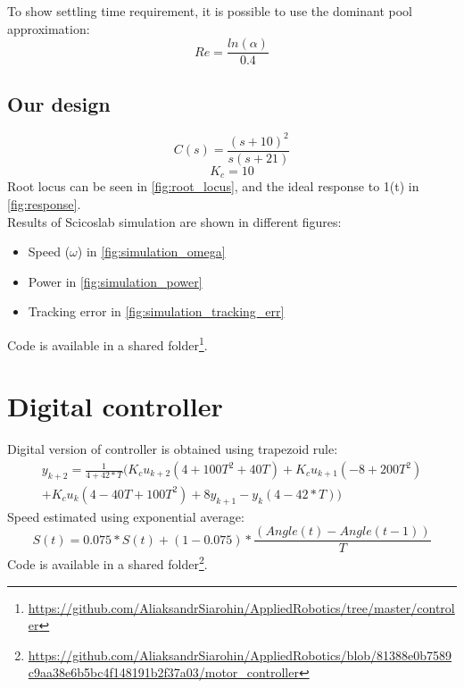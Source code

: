 \documentclass[a4paper,12pt,oneside]{article}
\begin{document}
To show settling time requirement, it is possible to use the dominant pool approximation:
\begin{equation}
Re = \frac{ln(\alpha)}{0.4}
\end{equation}

\subsection{Our design}
\begin{equation}
C(s) = \frac{(s+10)^2}{s(s+21)}
\end{equation}
\begin{equation}
K_c = 10
\end{equation}
Root locus can be seen in \cref{fig:root_locus}, and the ideal response to 1(t) in \cref{fig:response}.\\ Results of Scicoslab simulation are shown in different figures:
\begin{itemize}
\item Speed ($\omega$) in \cref{fig:simulation_omega}
\item Power in \cref{fig:simulation_power}
\item Tracking error in \cref{fig:simulation_tracking_err}
\end{itemize}
Code is available in a shared folder\footnote{\url{https://github.com/AliaksandrSiarohin/AppliedRobotics/tree/master/controler}}.

\section{Digital controller}
Digital version of controller is obtained using trapezoid rule:
\begin{multline}
y_{k+2} = \frac{1}{4 + 42 * T} (K_cu_{k+2}(4 + 100T^2 + 40T) + K_cu_{k+1}(-8 + 200T^2) \\+ K_cu_{k}(4 - 40T + 100T^2) + 8y_{k+1} - y_{k}(4 - 42*T))
\end{multline}
Speed estimated using exponential average:
\begin{equation}
S(t) = 0.075 * S(t) + (1 - 0.075) * \frac{(Angle(t) - Angle(t-1))}{T}
\end{equation}
Code is available in a shared folder\footnote{\url{https://github.com/AliaksandrSiarohin/AppliedRobotics/blob/81388e0b7589c9aa38e6b5bc4f148191b2f37a03/motor_controller}}.
\end{document}
